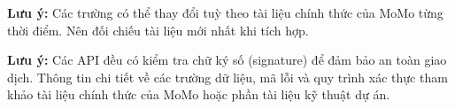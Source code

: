 \textbf{Lưu ý:} Các trường có thể thay đổi tuỳ theo tài liệu chính thức của MoMo từng thời điểm. Nên đối chiếu tài liệu mới nhất khi tích hợp.

\textbf{Lưu ý:} Các API đều có kiểm tra chữ ký số (signature) để đảm bảo an toàn giao dịch. Thông tin chi tiết về các trường dữ liệu, mã lỗi và quy trình xác thực tham khảo tài liệu chính thức của MoMo hoặc phần tài liệu kỹ thuật dự án.





